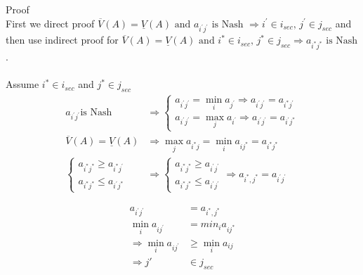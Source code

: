\documentclass[
  course = {{IE579 Game Theory and Multi-Agent Reinforcement Learning}},
  assignment = 1,
  name = {{Mohammad Mahdi Rahimi}},
  studentnumber = {{20208244}},
  email = {{mahi@kaist.ac.kr}},
  firstexercise = 1
]{aga-homework}
\begin{document}
\newpage
\exercise
\subexercise Proof
\\
First we direct proof $\overline{V}(A) = \underline{V}(A)\text{ and  } a_{i^\prime j^\prime }\text{ is Nash }\Rightarrow i^\prime \in i_{sec}\text{, } j^\prime \in j_{sec}$ and then use indirect proof for $\overline{V}(A) = \underline{V}(A)\text{ and  } i^* \in i_{sec}\text{, } j^* \in j_{sec}\Rightarrow a_{i^* j^* }\text{ is Nash}$.
\\
\\
Assume $i^* \in i_{sec}$ and $j^* \in j_{sec}$
\begin{equation}
    \begin{split}
    a_{i^\prime j^\prime} \text{is Nash} & \Rightarrow \begin{cases}
        a_{i^\prime j^\prime} = \min_i{a_{j^\prime}} \Rightarrow a_{i^\prime j^\prime} = a_{i^* j^\prime}\\
        a_{i^\prime j^\prime} = \max_j{a_{i^\prime}} \Rightarrow a_{i^\prime j^\prime} = a_{i^\prime j^*}
    \end{cases}\\
    \overline{V}(A) = \underline{V}(A) & \Rightarrow \max_j{a_{i^* j}} = \min_i{a_{i j^*}} = a_{i^* j^*}\\
    \begin{cases}
        a_{i^* j^*} \ge a_{i^* j^\prime}\\
        a_{i^* j^*} \le a_{i^\prime j^*}
    \end{cases} & \Rightarrow \begin{cases}
        a_{i^* j^*} \ge a_{i^\prime j^\prime}\\
        a_{i^* j^*} \le a_{i^\prime j^\prime}
    \end{cases} \Rightarrow a_{i^*, j^*} =  a_{i^\prime j^\prime}
    \end{split}
\end{equation}

\begin{equation}
    \begin{split}
        a_{i^\prime j^\prime} & = a_{i^*, j^*} \\
        \min_i{a_{i j^\prime}} & = min_i{a_{i j^*}}\\
        \Rightarrow \min_i{a_{i j^\prime}} & \ge \min_i{a_{ij}}\\
        \Rightarrow j\prime & \in j_{sec}
    \end{split}
\end{equation}
\end{document}
